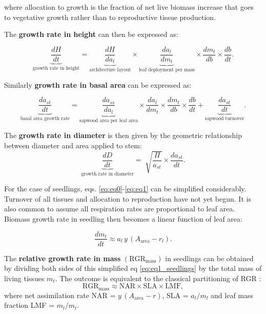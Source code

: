 \documentclass[a4paper]{article}\usepackage[]{graphicx}\usepackage[]{color}
\begin{document}
\begin{appendices}
where allocation to growth is the fraction of net live biomass increase that goes to vegetative growth rather than to reproductive tissue production.

The \textbf{growth rate in height} can then be expressed as:

\begin{equation}\label{eq:eq2}
\underbrace{\frac{dH}{dt}}_{\text{growth rate in height}} = \underbrace{\frac{dH}{da_{l}}}_{\text{architecture layout}} \times \underbrace{{\frac{da_{l}}{dm_{t}}}}_{\text{leaf deployment per mass}} \times {\frac{dm_t}{db}} \times {\frac{db}{dt}}.
\end{equation}

Similarly \textbf{growth rate in basal area} can be expressed as:

\begin{equation}\label{eq:eq3}
\underbrace{{\frac{da_{st}}{dt}}}_{\text{basal area growth rate}} = \underbrace{\frac{da_{ss}}{da_{l}}}_{\text{sapwood area per leaf area}} \times {\frac{da_{l}}{dm_{t}}} \times  {\frac{dm_t}{db}} \times {\frac{db}{dt}} +  \underbrace{ \frac{da_{st}}{dt}}_{\text{sapwood turnover}}.
\end{equation}

The \textbf{growth rate in diameter} is then given by the geometric relationship between diameter and area applied to stem:
\begin{equation}\label{eq:eq4}
\underbrace{\frac{dD}{dt}}_{\text{growth rate in diameter}} = \sqrt[]{\frac{\Pi}{a_{st}}} \times {\frac{da_{st}}{dt}}.
\end{equation}

For the case of seedlings, eqs. \ref{eq:eq0}-\ref{eq:eq1} can be simplified considerably. Turnover of all tissues and allocation to reproduction have not yet begun. It is also common to assume all respiration rates are proportional to leaf area. Biomass growth rate in seedling then becomes a linear function of leaf area:

\begin{equation}\label{eq:eq1_seedlings}
{\frac{dm_t}{dt}}  \approx  a_{l} \, y \, (A_{\textrm{area}} - r_{l}).
\end{equation}

The \textbf{relative growth rate in mass} $(\textrm{RGR}_{\textrm{mass}})$ in seedlings can be obtained by dividing both sides of this simplified eq \ref{eq:eq1_seedlings} by the total mass of living tissues $m_{t}$. The outcome is equivalent to the classical partitioning of RGR \citep{Lambers:1992bj, Cornelissen:1998ta}:
\begin{equation}\label{eq:eq1_seedlings_RGR}
\textrm{RGR}_{\textrm{mass}}  \approx \textrm{NAR} \times  \textrm{SLA} \times  \textrm{LMF},
\end{equation}
 where net assimilation rate NAR = $y \, (A_{\textrm{area}} - r)$, SLA = $a_{l}/ m_{l}$ and leaf mass fraction LMF = $m_{l}/ m_{t}$.



\end{appendices}
\end{document}
